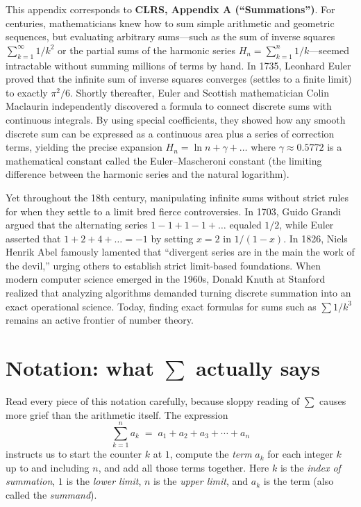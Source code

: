 \begin{historybox}
This appendix corresponds to \textbf{CLRS, Appendix A (``Summations'')}.
For centuries, mathematicians knew how to sum simple arithmetic and geometric
sequences, but evaluating arbitrary sums---such as the sum of inverse squares
$\sum_{k=1}^\infty 1/k^2$ or the partial sums of the harmonic series $H_n =
\sum_{k=1}^n 1/k$---seemed intractable without summing millions of terms by hand.
In 1735, Leonhard Euler proved that
the infinite sum of inverse squares converges (settles to a finite limit) to exactly $\pi^2/6$. Shortly
thereafter, Euler and Scottish mathematician Colin Maclaurin independently
discovered a formula to connect discrete sums with continuous integrals. By using
special coefficients, they showed how any smooth
discrete sum can be expressed as a continuous area plus a series of
correction terms, yielding the precise expansion $H_n = \ln n + \gamma + \dots$ where $\gamma \approx 0.5772$ is a mathematical constant called the Euler--Mascheroni constant (the limiting difference between the harmonic series and the natural logarithm).

Yet throughout the 18th century, manipulating infinite sums without strict rules for when they settle to a limit
bred fierce controversies. In 1703, Guido Grandi argued that the alternating
series $1 - 1 + 1 - 1 + \dots$ equaled $1/2$, while Euler asserted that $1 + 2 + 4 + \dots = -1$
by setting $x=2$ in $1/(1-x)$. In 1826, Niels Henrik Abel famously lamented that
``divergent series are in the main the work of the devil,'' urging others to establish strict limit-based foundations. When modern computer
science emerged in the 1960s, Donald Knuth at Stanford realized that analyzing algorithms
demanded turning discrete summation into an exact operational science. Today, finding exact formulas for sums
such as $\sum 1/k^3$ remains an active frontier of number theory.
\end{historybox}

\section{Notation: what \texorpdfstring{$\sum$}{the sigma} actually says}
\label{ch37:notation}

Read every piece of this notation carefully, because sloppy reading of $\sum$ causes more grief than
the arithmetic itself. The expression
\[
  \sum_{k=1}^{n} a_k \;=\; a_1 + a_2 + a_3 + \cdots + a_n
\]
instructs us to start the counter $k$ at $1$, compute the \emph{term} $a_k$ for
each integer $k$ up to and including $n$, and add all those terms together. Here
$k$ is the \emph{index of summation}, $1$ is the \emph{lower limit}, $n$ is the
\emph{upper limit}, and $a_k$ is the term (also called the \emph{summand}).

